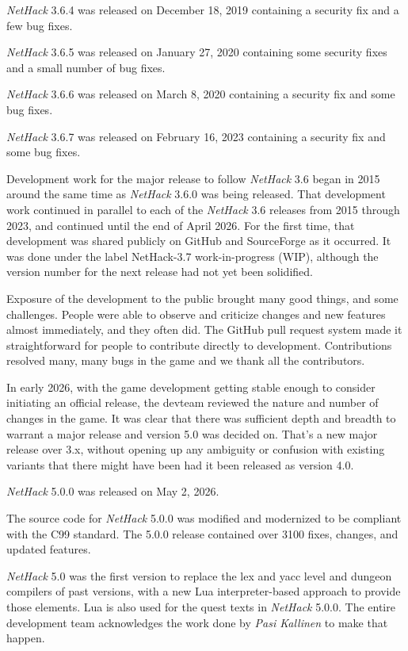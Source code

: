 \documentclass[titlepage]{article}
\begin{document}
\medskip
\textit{NetHack} 3.6.4 was released on December 18, 2019 containing a security fix and
a few bug fixes.

\medskip
\textit{NetHack} 3.6.5 was released on January 27, 2020 containing some security fixes
and a small number of bug fixes.

\medskip
\textit{NetHack} 3.6.6 was released on March 8, 2020 containing a security fix and
some bug fixes.

\medskip
\textit{NetHack} 3.6.7 was released on February 16, 2023 containing a security fix and
some bug fixes.

\medskip
Development work for the major release to follow \textit{NetHack} 3.6 began in 2015
around the same time as \textit{NetHack} 3.6.0 was being released. That development
work continued in parallel to each of the \textit{NetHack} 3.6 releases from 2015
through 2023, and continued until the end of April 2026.  For the first time,
that development was shared publicly on GitHub and SourceForge as it occurred.
It was done under the label NetHack-3.7 work-in-progress (WIP), although the
version number for the next release had not yet been solidified.

\medskip
Exposure of the development to the public brought many good things, and some
challenges. People were able to observe and criticize changes and new features
almost immediately, and they often did. The GitHub pull request system made
it straightforward for people to contribute directly to development.
Contributions resolved many, many bugs in the game and we thank all the
contributors.

\medskip
In early 2026, with the game development getting stable enough to consider
initiating an official release, the devteam reviewed the nature and number of
changes in the game. It was clear that there was sufficient depth and
breadth to warrant a major release and version 5.0 was decided on.
That's a new major release over 3.x, without opening up any ambiguity
or confusion with existing variants that there might have been had it
been released as version 4.0.

\medskip
\textit{NetHack} 5.0.0 was released on May 2, 2026.

\medskip
The source code for \textit{NetHack} 5.0.0 was modified and modernized to be
compliant with the C99 standard. The 5.0.0 release contained over 3100 fixes,
changes, and updated features.

\medskip
\textit{NetHack} 5.0 was the first version to replace the lex and yacc level
and dungeon compilers of past versions, with a new Lua interpreter-based
approach to provide those elements. Lua is also used for the quest texts
in \textit{NetHack} 5.0.0. The entire development team acknowledges the work
done by \textit{Pasi Kallinen} to make that happen.
\end{document}
